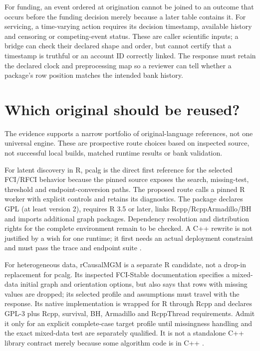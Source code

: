 For funding, an event ordered at origination cannot be joined to an outcome
that occurs before the funding decision merely because a later table contains
it. For servicing, a time-varying action requires its decision timestamp,
available history and censoring or competing-event status. These are caller
scientific inputs; a bridge can check their declared shape and order, but
cannot certify that a timestamp is truthful or an account ID correctly linked.
The response must retain the declared clock and preprocessing map so a
reviewer can tell whether a package's row position matches the intended bank
history.

\section{Which original should be reused?}

The evidence supports a narrow portfolio of original-language references, not
one universal engine. These are prospective route choices based on inspected
source, not successful local builds, matched runtime results or bank
validation.

For latent discovery in R, pcalg is the direct first reference for the selected
FCI/RFCI behavior because the pinned source exposes the search, missing-test,
threshold and endpoint-conversion paths. The proposed route calls a pinned R
worker with explicit controls and retains its diagnostics. The package declares
GPL (at least version 2), requires R 3.5 or later, links Rcpp/RcppArmadillo/BH
and imports additional graph packages. Dependency resolution and distribution
rights for the complete environment remain to be checked. A C++ rewrite is not
justified by a wish for one runtime; it first needs an actual deployment
constraint and must pass the trace and endpoint suite
\citep{exec13_pcalg_reuse_primary,exec13_latentr_primary}.

For heterogeneous data, rCausalMGM is a separate R candidate, not a drop-in
replacement for pcalg. Its inspected FCI-Stable documentation specifies a
mixed-data initial graph and orientation options, but also says that rows with
missing values are dropped; its selected profile and assumptions must travel
with the response. Its native implementation is wrapped for R through Rcpp
and declares GPL-3 plus Rcpp, survival, BH, Armadillo and RcppThread
requirements. Admit it only for an explicit complete-case target profile
until missingness handling and the exact mixed-data test are separately
qualified. It is not a standalone C++ library contract merely because some
algorithm code is in C++ \citep{exec14_native_rcmgm}.

